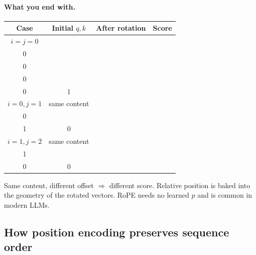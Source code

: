 \documentclass[11pt]{article}
\begin{document}
\paragraph{What you end with.}
\begin{center}
\begin{tabular}{@{}cccc@{}}
\toprule
Case & Initial \(q,k\) & After rotation & Score \\
\midrule
\(i=j=0\)
  & \(\begin{bmatrix}1\\0\end{bmatrix},\begin{bmatrix}1\\0\end{bmatrix}\)
  & \(\begin{bmatrix}1\\0\end{bmatrix},\begin{bmatrix}1\\0\end{bmatrix}\)
  & \(1\) \\[1.1em]
\(i=0,j=1\)
  & same content
  & \(\begin{bmatrix}1\\0\end{bmatrix},\begin{bmatrix}0\\1\end{bmatrix}\)
  & \(0\) \\[1.1em]
\(i=1,j=2\)
  & same content
  & \(\begin{bmatrix}0\\1\end{bmatrix},\begin{bmatrix}-1\\0\end{bmatrix}\)
  & \(0\) \\
\bottomrule
\end{tabular}
\end{center}
Same content, different offset \(\Rightarrow\) different score. Relative
position is baked into the geometry of the rotated vectors. RoPE needs no
learned \(p\) and is common in modern LLMs.

\subsection{How position encoding preserves sequence order}
\end{document}
